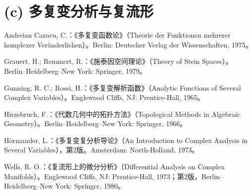 \section*{(c) 多复变分析与复流形}
\begin{description}[style=nextline,leftmargin=2em]
\item[{[30]}] Andreian Cazacu, C.：《多复变函数论》（Theorie der Funktionen mehrerer komplexer Veränderlichen）。Berlin: Deutscher Verlag der Wissenschaften, 1975。
\item[{[31]}] Grauert, H.; Remmert, R.：《施泰因空间理论》（Theory of Stein Spaces）。Berlin--Heidelberg--New York: Springer, 1979。
\item[{[32]}] Gunning, R. C.; Rossi, H.：《多复变解析函数》（Analytic Functions of Several Complex Variables）。Englewood Cliffs, NJ: Prentice-Hall, 1965。
\item[{[33]}] Hirzebruch, F.：《代数几何中的拓扑方法》（Topological Methods in Algebraic Geometry）。Berlin--Heidelberg--New York: Springer, 1966。
\item[{[34]}] Hörmander, L.：《多复变复分析导论》（An Introduction to Complex Analysis in Several Variables），第2版。Amsterdam: North-Holland, 1973。
\item[{[35]}] Wells, R. O.：《复流形上的微分分析》（Differential Analysis on Complex Manifolds）。Englewood Cliffs, NJ: Prentice-Hall, 1973；第2版，Berlin--Heidelberg--New York: Springer, 1980。
\end{description}
